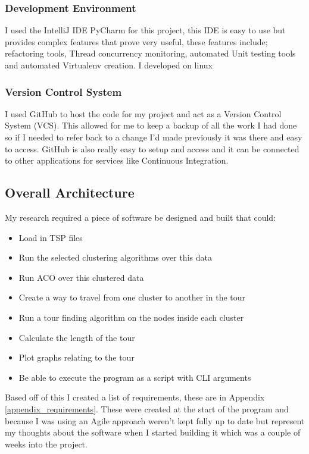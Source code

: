 \subsubsection{Development Environment}

I used the IntelliJ IDE PyCharm for this project\cite{pycharmide}, this IDE is easy to use but provides complex features that prove very useful, these features include; refactoring tools, Thread concurrency monitoring, automated Unit testing tools and automated Virtualenv creation. I developed on linux 

\subsubsection{Version Control System}
I used GitHub\cite{github} to host the code for my project and act as a Version Control System (VCS). This allowed for me to keep a backup of all the work I had done so if I needed to refer back to a change I'd made previously it was there and easy to access. GitHub is also really easy to setup and access and it can be connected to other applications for services like Continuous Integration.

\subsection{Overall Architecture}

My research required a piece of software be designed and built that could:

\begin{itemize}
    \item Load in TSP files
    \item Run the selected clustering algorithms over this data
    \item Run ACO over this clustered data
    \item Create a way to travel from one cluster to another in the tour
    \item Run a tour finding algorithm on the nodes inside each cluster
    \item Calculate the length of the tour
    \item Plot graphs relating to the tour
    \item Be able to execute the program as a script with CLI arguments
\end{itemize}

Based off of this I created a list of requirements, these are in Appendix \ref{appendix_requirements}. These were created at the start of the program and because I was using an Agile approach weren't kept fully up to date but represent my thoughts about the software when I started building it which was a couple of weeks into the project.

